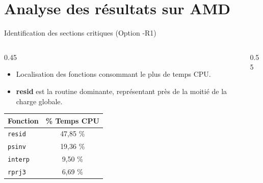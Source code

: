\section[Analyse AMD]{Analyse des résultats sur AMD}

\begin{frame}{Identification des sections critiques (Option -R1)}
    \begin{columns}[T]
        \begin{column}{0.45\textwidth}
            \begin{itemize}
                \fontsize{8}{9}\selectfont
                \item Localisation des fonctions consommant le plus de temps CPU.
                \item \textbf{resid} est la routine dominante, représentant près de la moitié de la charge globale.
            \end{itemize}
            \vspace{0.1cm}
            \begin{table}
                \fontsize{6}{7}\selectfont
                \centering
                \begin{tabular}{|l|c|}
                    \hline
                    \textbf{Fonction} & \textbf{\% Temps CPU} \\ \hline
                    \texttt{resid}    & 47,85 \% \\ \hline
                    \texttt{psinv}    & 19,36 \% \\ \hline
                    \texttt{interp}   & 9,50 \%  \\ \hline
                    \texttt{rprj3}    & 6,69 \%  \\ \hline
                \end{tabular}
            \end{table}
        \end{column}
        \begin{column}{0.55\textwidth}
            \vspace{-0.4cm}
        \end{column}
    \end{columns}
\end{frame}

